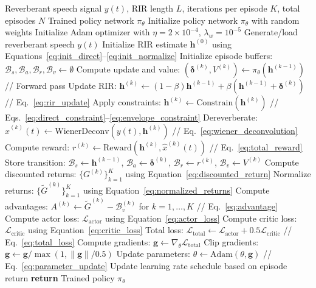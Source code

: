 \begin{algorithm}[htbp]
\caption{Neural Policy for Blind RIR Estimation}
\label{alg:neural_rir}
\begin{algorithmic}[1]
\REQUIRE Reverberant speech signal $y(t)$, RIR length $L$, iterations per episode $K$, total episodes $N$
\ENSURE Trained policy network $\pi_\theta$
\STATE Initialize policy network $\pi_\theta$ with random weights
\STATE Initialize Adam optimizer with $\eta = 2 \times 10^{-4}$, $\lambda_w = 10^{-5}$
    \STATE Generate/load reverberant speech $y(t)$
    \STATE Initialize RIR estimate $\mathbf{h}^{(0)}$ using Equations~\ref{eq:init_direct}--\ref{eq:init_normalize}
    \STATE Initialize episode buffers: $\mathcal{B}_s, \mathcal{B}_a, \mathcal{B}_r, \mathcal{B}_v \leftarrow \emptyset$
        \STATE Compute update and value: $(\boldsymbol{\delta}^{(k)}, V^{(k)}) \leftarrow \pi_\theta(\mathbf{h}^{(k-1)})$ \hfill {\scriptsize // Forward pass}
        \STATE Update RIR: $\mathbf{h}^{(k)} \leftarrow (1-\beta)\mathbf{h}^{(k-1)} + \beta(\mathbf{h}^{(k-1)} + \boldsymbol{\delta}^{(k)})$ \hfill {\scriptsize // Eq.~\ref{eq:rir_update}}
        \STATE Apply constraints: $\mathbf{h}^{(k)} \leftarrow \text{Constrain}(\mathbf{h}^{(k)})$ \hfill {\scriptsize // Eqs.~\ref{eq:direct_constraint}--\ref{eq:envelope_constraint}}
        \STATE Dereverberate: $\hat{x}^{(k)}(t) \leftarrow \text{WienerDeconv}(y(t), \mathbf{h}^{(k)})$ \hfill {\scriptsize // Eq.~\ref{eq:wiener_deconvolution}}
        \STATE Compute reward: $r^{(k)} \leftarrow \text{Reward}(\mathbf{h}^{(k)}, \hat{x}^{(k)}(t))$ \hfill {\scriptsize // Eq.~\ref{eq:total_reward}}
        \STATE Store transition: $\mathcal{B}_s \leftarrow \mathbf{h}^{(k-1)}$, $\mathcal{B}_a \leftarrow \boldsymbol{\delta}^{(k)}$, $\mathcal{B}_r \leftarrow r^{(k)}$, $\mathcal{B}_v \leftarrow V^{(k)}$
    \ENDFOR
    \STATE Compute discounted returns: $\{G^{(k)}\}_{k=1}^K$ using Equation~\ref{eq:discounted_return}
    \STATE Normalize returns: $\{\tilde{G}^{(k)}\}_{k=1}^K$ using Equation~\ref{eq:normalized_returns}
    \STATE Compute advantages: $A^{(k)} \leftarrow \tilde{G}^{(k)} - \mathcal{B}_v^{(k)}$ for $k = 1, \ldots, K$ \hfill {\scriptsize // Eq.~\ref{eq:advantage}}
    \STATE Compute actor loss: $\mathcal{L}_\text{actor}$ using Equation~\ref{eq:actor_loss}
    \STATE Compute critic loss: $\mathcal{L}_\text{critic}$ using Equation~\ref{eq:critic_loss}
    \STATE Total loss: $\mathcal{L}_\text{total} \leftarrow \mathcal{L}_\text{actor} + 0.5 \mathcal{L}_\text{critic}$ \hfill {\scriptsize // Eq.~\ref{eq:total_loss}}
    \STATE Compute gradients: $\mathbf{g} \leftarrow \nabla_\theta \mathcal{L}_\text{total}$
    \STATE Clip gradients: $\mathbf{g} \leftarrow \mathbf{g} / \max(1, \|\mathbf{g}\|/0.5)$
    \STATE Update parameters: $\theta \leftarrow \text{Adam}(\theta, \mathbf{g})$ \hfill {\scriptsize // Eq.~\ref{eq:parameter_update}}
    \STATE Update learning rate schedule based on episode return
\ENDFOR
\STATE \textbf{return} Trained policy $\pi_\theta$
\end{algorithmic}
\end{algorithm}

